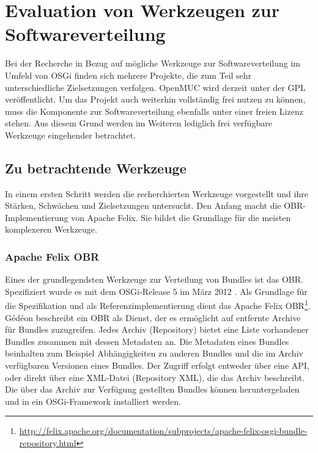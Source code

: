 \chapter{Evaluation von Werkzeugen zur Softwareverteilung}
\label{cha:evaluation}
Bei der Recherche in Bezug auf mögliche Werkzeuge zur Softwareverteilung im Umfeld von OSGi finden sich mehrere Projekte,
die zum Teil sehr unterschiedliche Zielsetzungen verfolgen.
OpenMUC wird derzeit unter der \ac{GPL} veröffentlicht. Um das Projekt auch weiterhin vollständig frei
nutzen zu können, muss die Komponente zur Softwareverteilung ebenfalls unter einer freien Lizenz stehen.
Aus diesem Grund werden im Weiteren lediglich frei verfügbare Werkzeuge eingehender betrachtet. 

\section{Zu betrachtende Werkzeuge}
\label{werkzeuge}
In einem ersten Schritt werden die recherchierten Werkzeuge vorgestellt und ihre Stärken, Schwächen und Zielsetzungen untersucht.
Den Anfang macht die \acf{OBR}-Implementierung von Apache Felix. Sie bildet die Grundlage für die meisten komplexeren Werkzeuge. 

\subsection{Apache Felix \acs{OBR}}

Eines der grundlegendsten Werkzeuge zur Verteilung von Bundles ist das \ac{OBR}. Spezifiziert wurde es
mit dem \ac{OSGi}-Release 5 im März 2012 \cite[S.529-542]{osgi_r5}. Als Grundlage für die Spezifikation und als Referenzimplementierung 
dient das Apache Felix \ac{OBR}\footnote{\url{http://felix.apache.org/documentation/subprojects/apache-felix-osgi-bundle-repository.html}}.\\

Gédéon \cite{osgi_felix3} beschreibt ein \ac{OBR} als Dienst, der es ermöglicht auf entfernte Archive für Bundles zuzugreifen.
Jedes Archiv (Repository) bietet eine Liste vorhandener Bundles zusammen mit dessen Metadaten an.
Die Metadaten eines Bundles beinhalten zum Beispiel Abhängigkeiten zu anderen Bundles und die im Archiv verfügbaren Versionen eines Bundles.
Der Zugriff erfolgt entweder über eine \ac{API}, oder direkt über eine \ac{XML}-Datei (Repository \ac{XML}), die das Archiv beschreibt.
Die über das Archiv zur Verfügung gestellten Bundles können heruntergeladen und in ein \ac{OSGi}-Framework installiert werden.\\

